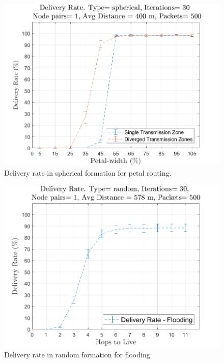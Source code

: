 \begin{figure}[hbtp]
\centering
\includegraphics[width=\simResultFigSize \textwidth]{ncsuthesis-0.6/Chapter-5/figs/pe_DR_spherical.png}
\caption{Delivery rate in spherical formation for petal routing.}
\label{fig:pe_DR_spherical}
\end{figure}

\begin{figure}[hbtp]
\centering
\includegraphics[width=\simResultFigSize \textwidth]{ncsuthesis-0.6/Chapter-5/figs/fl_DR_random.png}
\caption{Delivery rate in random formation for flooding}
\label{fig:fl_DR_random}
\end{figure}

